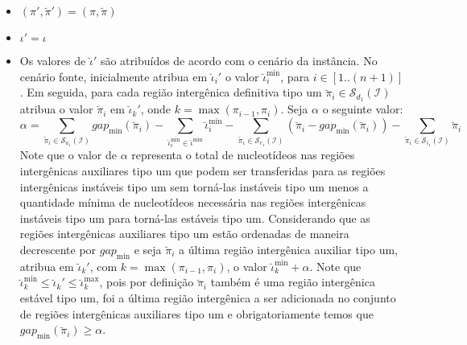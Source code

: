 \begin{itemize}
  \item $(\pi',\breve\pi') = (\pi,\breve\pi)$
  \item $\iota' = \iota$
  \item Os valores de $\breve\iota'$ são atribuídos de acordo com o cenário da instância. No cenário fonte, inicialmente atribua em $\breve\iota_{i}'$ o valor $\breve\iota^{\min}_i$, para $i \in [1..({n+1})]$. Em seguida, para cada região intergênica definitiva tipo um $\breve\pi_i \in \mathcal{S}_{d_{1}}(\mathcal{I})$ atribua o valor $\breve\pi_i$ em $\breve\iota_{k}'$, onde $k = \max(\pi_{i-1},\pi_i)$. Seja $\alpha$ o seguinte valor:
  $$\alpha = \sum_{\breve\pi_i \in \mathcal{S}_{a_{1}}(\mathcal{I})} gap_{\min}(\breve\pi_i) - \sum_{\breve\iota_{i}^{\min}  \in \breve\iota^{\min}} \breve\iota_{i}^{\min} - \sum_{\breve\pi_i \in \mathcal{S}_{e_{1}}(\mathcal{I})} (\breve\pi_i - gap_{\min}(\breve\pi_i)) - \sum_{\breve\pi_i \in \mathcal{S}_{i_{1}}(\mathcal{I})} \breve\pi_i$$
  Note que o valor de $\alpha$ representa o total de nucleotídeos nas regiões intergênicas auxiliares tipo um que podem ser transferidas para as regiões intergênicas instáveis tipo um sem torná-las instáveis tipo um menos a quantidade mínima de nucleotídeos necessária nas regiões intergênicas instáveis tipo um para torná-las estáveis tipo um. Considerando que as regiões intergênicas auxiliares tipo um estão ordenadas de maneira decrescente por $gap_{\min}$ e seja $\breve\pi_i$ a última região intergênica auxiliar tipo um, atribua em $\breve\iota_{k}'$, com $k = \max(\pi_{i-1},\pi_i)$, o valor $\breve\iota^{\min}_k + \alpha$. Note que $\breve\iota^{\min}_k \le \breve\iota_{k}' \le \breve\iota^{\max}_k$, pois por definição $\breve\pi_i$ também é uma região intergênica estável tipo um, foi a última região intergênica a ser adicionada no conjunto de regiões intergênicas auxiliares tipo um e obrigatoriamente temos que $gap_{\min}(\breve\pi_i) \ge \alpha$.


\end{itemize}
